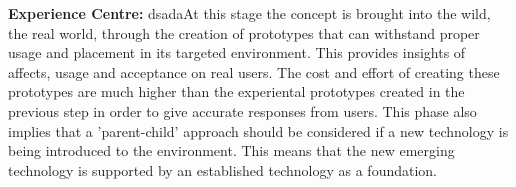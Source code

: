 \textbf{Experience Centre:}
 dsadaAt this stage the concept is brought into the wild, the real world, through the creation of prototypes that can withstand proper usage and placement in its targeted environment. This provides insights of affects, usage and acceptance on real users. The cost and effort of creating these prototypes are much higher than the experiental prototypes created in the previous step in order to give accurate responses from users. This phase also implies that a 'parent-child' approach should be considered if a new technology is being introduced to the environment. This means that the new emerging technology is supported by an established technology as a foundation.
